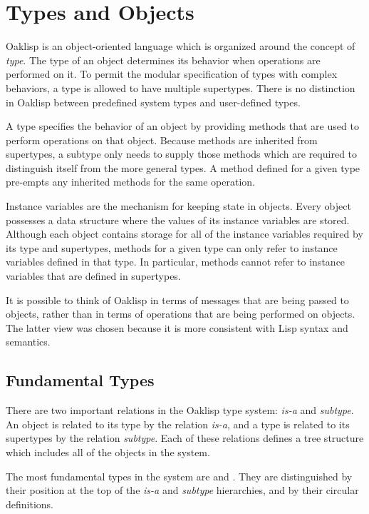 \chapter{Types and Objects} \label{types}


Oaklisp is an object-oriented language which is organized around the
concept of {\it type}.  The type of an object determines its behavior
when operations are performed on it.  To permit the modular
specification of types with complex behaviors, a type is allowed to
have multiple supertypes.  There is no distinction in Oaklisp between
predefined system types and user-defined types.

A type specifies the behavior of an object by providing methods that
are used to perform operations on that object.  Because methods are
inherited from supertypes, a subtype only needs to supply those
methods which are required to distinguish itself from the more general
types.  A method defined for a given type pre-empts any inherited
methods for the same operation.

Instance variables are the mechanism for keeping state in objects.
Every object possesses a data structure where the values of its
instance variables are stored.  Although each object contains storage
for all of the instance variables required by its type and supertypes,
methods for a given type can only refer to instance variables defined
in that type.  In particular, methods cannot refer to instance
variables that are defined in supertypes.

It is possible to think of Oaklisp in terms of messages that are being
passed to objects, rather than in terms of operations that are being
performed on objects.  The latter view was chosen because it is more
consistent with Lisp syntax and semantics.

\section{Fundamental Types}

There are two important relations in the Oaklisp type system: {\it
is-a} and {\it subtype}.  An object is related to its type by the
relation {\it is-a}, and a type is related to its supertypes by the
relation {\it subtype}.  Each of these relations defines a tree
structure which includes all of the objects in the system.

The most fundamental types in the system are  and
.  They are distinguished by their position at the top of
the {\it is-a} and {\it subtype} hierarchies, and by their circular
definitions.

